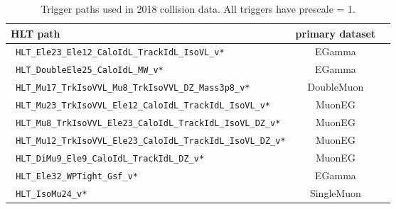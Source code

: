 \begin{table*}
  \caption{Trigger paths used in 2018 collision data. All triggers have prescale = 1.}
  \label{tab:trigpat2018}
  \centering
  \begin{tabular}{|l|c|l|} 
    \hline %
    HLT path                                                      & primary dataset \\
    \hline %
    \verb| HLT_Ele23_Ele12_CaloIdL_TrackIdL_IsoVL_v*            | & EGamma \\
    \verb| HLT_DoubleEle25_CaloIdL_MW_v*                        | & EGamma \\
    \verb| HLT_Mu17_TrkIsoVVL_Mu8_TrkIsoVVL_DZ_Mass3p8_v*       | & DoubleMuon \\
    \verb| HLT_Mu23_TrkIsoVVL_Ele12_CaloIdL_TrackIdL_IsoVL_v*   | & MuonEG \\
    \verb| HLT_Mu8_TrkIsoVVL_Ele23_CaloIdL_TrackIdL_IsoVL_DZ_v* | & MuonEG \\
    \verb| HLT_Mu12_TrkIsoVVL_Ele23_CaloIdL_TrackIdL_IsoVL_DZ_v*| & MuonEG \\
    \verb| HLT_DiMu9_Ele9_CaloIdL_TrackIdL_DZ_v*                | & MuonEG \\
    \verb| HLT_Ele32_WPTight_Gsf_v*                             | & EGamma \\
    \verb| HLT_IsoMu24_v*                                       | & SingleMuon \\
    \hline %
  \end{tabular}
\end{table*}
